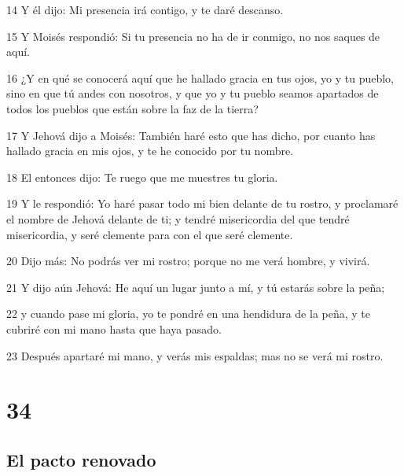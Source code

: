 \par 14 Y él dijo: Mi presencia irá contigo, y te daré descanso.
\par 15 Y Moisés respondió: Si tu presencia no ha de ir conmigo, no nos saques de aquí.
\par 16 ¿Y en qué se conocerá aquí que he hallado gracia en tus ojos, yo y tu pueblo, sino en que tú andes con nosotros, y que yo y tu pueblo seamos apartados de todos los pueblos que están sobre la faz de la tierra?
\par 17 Y Jehová dijo a Moisés: También haré esto que has dicho, por cuanto has hallado gracia en mis ojos, y te he conocido por tu nombre.
\par 18 El entonces dijo: Te ruego que me muestres tu gloria.
\par 19 Y le respondió: Yo haré pasar todo mi bien delante de tu rostro, y proclamaré el nombre de Jehová delante de ti; y tendré misericordia del que tendré misericordia, y seré clemente para con el que seré clemente.
\par 20 Dijo más: No podrás ver mi rostro; porque no me verá hombre, y vivirá.
\par 21 Y dijo aún Jehová: He aquí un lugar junto a mí, y tú estarás sobre la peña;
\par 22 y cuando pase mi gloria, yo te pondré en una hendidura de la peña, y te cubriré con mi mano hasta que haya pasado.
\par 23 Después apartaré mi mano, y verás mis espaldas; mas no se verá mi rostro.

\chapter{34}

\section*{El pacto renovado}

